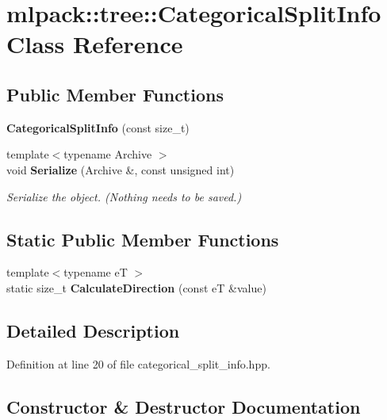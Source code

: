 \section{mlpack\+:\+:tree\+:\+:Categorical\+Split\+Info Class Reference}
\label{classmlpack_1_1tree_1_1CategoricalSplitInfo}
\subsection*{Public Member Functions}
\begin{DoxyCompactItemize}
\item 
{\bf Categorical\+Split\+Info} (const size\+\_\+t)
\item 
{\footnotesize template$<$typename Archive $>$ }\\void {\bf Serialize} (Archive \&, const unsigned int)
\begin{DoxyCompactList}\small\item\em Serialize the object. (Nothing needs to be saved.) \end{DoxyCompactList}\end{DoxyCompactItemize}
\subsection*{Static Public Member Functions}
\begin{DoxyCompactItemize}
\item 
{\footnotesize template$<$typename eT $>$ }\\static size\+\_\+t {\bf Calculate\+Direction} (const eT \&value)
\end{DoxyCompactItemize}


\subsection{Detailed Description}


Definition at line 20 of file categorical\+\_\+split\+\_\+info.\+hpp.



\subsection{Constructor \& Destructor Documentation}
